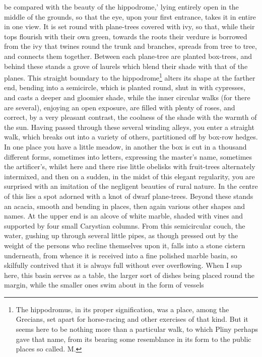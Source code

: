 be compared with the beauty of the hippodrome,' lying entirely open in the
middle of the grounds, so that the eye, upon your first entrance, takes it
in entire in one view. It is set round with plane-trees covered with ivy,
so that, while their tops flourish with their own green, towards the roots
their verdure is borrowed from the ivy that twines round the trunk and
branches, spreads from tree to tree, and connects them together. Between
each plane-tree are planted box-trees, and behind these stands a grove of
laurels which blend their shade with that of the planes. This straight
boundary to the hippodrome\footnote{The hippodromus, in its
proper signification, was a place, among the Grecians, set apart for
horse-racing and other exercises of that kind. But it seems here to be
nothing more than a particular walk, to which Pliny perhaps gave that
name, from its bearing some resemblance in its form to the public places
so called. M.} alters its shape at the farther end, bending
into a semicircle, which is planted round, shut in with cypresses, and
casts a deeper and gloomier shade, while the inner circular walks (for
there are several), enjoying an open exposure, are filled with plenty of
roses, and correct, by a very pleasant contrast, the coolness of the shade
with the warmth of the sun. Having passed through these several winding
alleys, you enter a straight walk, which breaks out into a variety of
others, partitioned off by box-row hedges. In one place you have a little
meadow, in another the box is cut in a thousand different forms, sometimes
into letters, expressing the master's name, sometimes the artificer's,
whilst here and there rise little obelisks with fruit-trees alternately
intermixed, and then on a sudden, in the midst of this elegant regularity,
you are surprised with an imitation of the negligent beauties of rural
nature. In the centre of this lies a spot adorned with a knot of dwarf
plane-trees. Beyond these stands an acacia, smooth and bending in places,
then again various other shapes and names. At the upper end is an alcove
of white marble, shaded with vines and supported by four small Carystian
columns. From this semicircular couch, the water, gushing up through
several little pipes, as though pressed out by the weight of the persons
who recline themselves upon it, falls into a stone cistern underneath,
from whence it is received into a fine polished marble basin, so skilfully
contrived that it is always full without ever overflowing. When I sup
here, this basin serves as a table, the larger sort of dishes being placed
round the margin, while the smaller ones swim about in the form of vessels
